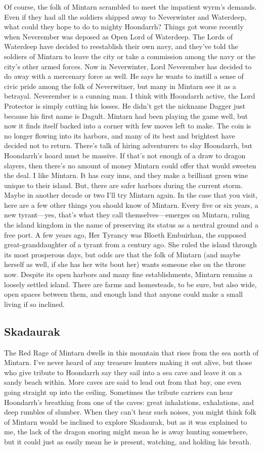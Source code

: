 \documentclass[10pt,a4paper,twoside,twocolumn,openany,bg=print,nodeprecatedcode]{dndbook}
\begin{document}
Of course, the folk of Mintarn scrambled to meet the impatient wyrm's demands. Even if they had all the soldiers shipped away to Neverwinter and Waterdeep, what could they hope to do to mighty Hoondarrh?
Things got worse recently when Neverember was deposed as Open Lord of Waterdeep. The Lords of Waterdeep have decided to reestablish their own navy, and they've told the soldiers of Mintarn to leave the city or take a commission among the navy or the city's other armed forces. Now in Neverwinter, Lord Neverember has decided to do away with a mercenary force as well. He says he wants to instill a sense of civic pride among the folk of Neverwitner, but many in Mintarn see it as a betrayal. Neverember is a cunning man. I think with Hoondarrh active, the Lord Protector is simply cutting his losses. He didn't get the nickname Dagger just because his first name is Dagult.
Mintarn had been playing the game well, but now it finds itself backed into a corner with few moves left to make. The coin is no longer flowing into its harbors, and many of its best and brightest have decided not to return. There's talk of hiring adventurers to slay Hoondarrh, but Hoondarrh's hoard must be massive. If that's not enough of a draw to dragon slayers, then there's no amount of money Mintarn could offer that would sweeten the deal.
I like Mintarn. It has cozy inns, and they make a brilliant green wine unique to their island. But, there are safer harbors during the current storm. Maybe in another decade or two I'll try Mintarn again. In the case that you visit, here are a few other things you should know of Mintarn.
Every five or six years, a new tyrant—yes, that's what they call themselves—emerges on Mintarn, ruling the island kingdom in the name of preserving its status as a neutral ground and a free port. A few years ago, Her Tyrancy was Bloeth Embuirhan, the supposed great-granddaughter of a tyrant from a century ago. She ruled the island through its most prosperous days, but odds are that the folk of Mintarn (and maybe herself as well, if she has her wits bout her) wants someone else on the throne now.
Despite its open harbors and many fine establishments, Mintarn remains a loosely settled island. There are farms and homesteads, to be sure, but also wide, open spaces between them, and enough land that anyone could make a small living if so inclined.
\subsection{Skadaurak}
The Red Rage of Mintarn dwells in this mountain that rises from the sea north of Mintarn. I've never heard of any treasure hunters making it out alive, but those who give tribute to Hoondarrh say they sail into a sea cave and leave it on a sandy beach within. More caves are said to lead out from that bay, one even going straight up into the ceiling. Sometimes the tribute carriers can hear Hoondarrh's breathing from one of the caves: great inhalations, exhalations, and deep rumbles of slumber. When they can't hear such noises, you might think folk of Mintarn would be inclined to explore Skadaurak, but as it was explained to me, the lack of the dragon snoring might mean he is away hunting somewhere, but it could just as easily mean he is present, watching, and holding his breath.
\end{document}
